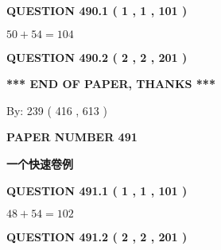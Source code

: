 \documentclass{ctexart}
\begin{document}
{\textbf{\Large{QUESTION
490.1 
 ( 1 , 1 , 101 )
}}}
  
  
 
 

$ %
50 +  %
54=   %
104$
 
 
  
\vspace{0.2in}
  
{\textbf{\Large{QUESTION
490.2 
 ( 2 , 2 , 201 )
}}}
  
  
   
   
 \vspace{0.2in}
 
   
   
   
   
\vspace{1.0in} 
{\textbf{\large{ *** END OF PAPER, THANKS *** }}} 
   
   
\hspace{1.0in} By: 
 239 ( 416 ,  613 )
   
   
   
   
\newpage 
\setcounter{page}{ 
   491001 } 
   
   
   
   
 {\textbf{ \Large{ PAPER NUMBER  491  }}}
   
   
\vspace{0.2in}
   
   
   
   
   
   
 \vspace{0.2in}
{\LARGE {\textbf{ 一个快速卷例}}}
   
   
  
\vspace{0.2in}
  
{\textbf{\Large{QUESTION
491.1 
 ( 1 , 1 , 101 )
}}}
  
  
 
 

$ %
48 +  %
54=   %
102$
 
 
  
\vspace{0.2in}
  
{\textbf{\Large{QUESTION
491.2 
 ( 2 , 2 , 201 )
}}}
  
  
   
   
 \vspace{0.2in}
 
   
   
\end{document}
